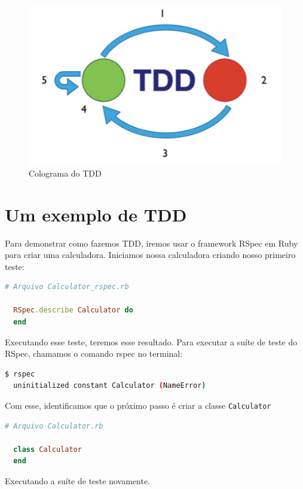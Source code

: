 \documentclass[12pt]{article}
\newcommand{\code}[1]{\texttt{#1}}
\begin{document}
  \begin{figure}[H]
    \centering
    \includegraphics[scale=1.0]{tdd_micro}
    \caption{Colograma do TDD}
  \end{figure}

  \section{Um exemplo de TDD}

  Para demonstrar como fazemos TDD, iremos usar o framework RSpec em Ruby para
  criar uma calculadora. Iniciamos nossa calculadora criando nosso primeiro 
  teste:

  \begin{lstlisting}[language=Ruby]
  # Arquivo Calculator_rspec.rb

  RSpec.describe Calculator do
  end
  \end{lstlisting}

  Executando esse teste, teremos esse resultado. Para executar a suíte de teste
  do RSpec, chamamos o comando rspec no terminal:

  \begin{lstlisting}[language=bash]
  $ rspec
  uninitialized constant Calculator (NameError)
  \end{lstlisting}

  Com esse, identificamos que o próximo passo é criar a classe \code{Calculator}

  \begin{lstlisting}[language=Ruby]
  # Arquivo Calculator.rb

  class Calculator
  end
  \end{lstlisting}

  Executando a suíte de teste novamente.
\end{document}
